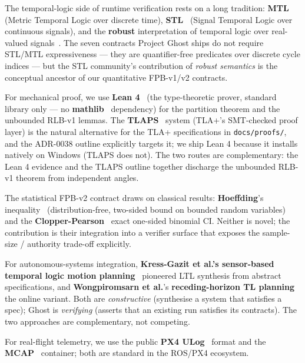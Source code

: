 \documentclass[11pt,a4paper]{article}
\begin{document}
The temporal-logic side of runtime verification rests on a long
tradition: \textbf{MTL}~\cite{koymans1990specifying} (Metric
Temporal Logic over discrete time), \textbf{STL}~\cite{maler2004monitoring}
(Signal Temporal Logic over continuous signals), and the
\textbf{robust} interpretation of temporal logic over real-valued
signals~\cite{donze2013breach}. The seven contracts Project Ghost
ships do not require STL/MTL expressiveness --- they are
quantifier-free predicates over discrete cycle indices --- but
the STL community's contribution of \emph{robust semantics} is
the conceptual ancestor of our quantitative FPB-v1/v2 contracts.

For mechanical proof, we use \textbf{Lean 4}~\cite{moura2021lean4}
(the type-theoretic prover, standard library only --- no
\textbf{mathlib}~\cite{mathlib2024lean} dependency) for the
partition theorem and the unbounded RLB-v1 lemmas. The
\textbf{TLAPS}~\cite{cousineau2012tlaps} system (TLA+'s SMT-checked
proof layer) is the natural alternative for the TLA+
specifications in \texttt{docs/proofs/}, and the ADR-0038 outline
explicitly targets it; we ship Lean 4 because it installs natively
on Windows (TLAPS does not). The two routes are complementary:
the Lean 4 evidence and the TLAPS outline together discharge the
unbounded RLB-v1 theorem from independent angles.

The statistical FPB-v2 contract draws on classical results:
\textbf{Hoeffding}'s
inequality~\cite{hoeffding1963inequalities} (distribution-free,
two-sided bound on bounded random variables) and the
\textbf{Clopper-Pearson}~\cite{clopper1934binomial} exact
one-sided binomial CI. Neither is novel; the contribution is
their integration into a verifier surface that exposes the
sample-size / authority trade-off explicitly.

For autonomous-systems integration, \textbf{Kress-Gazit et al.'s
sensor-based temporal logic motion
planning}~\cite{kress2007shielding} pioneered LTL synthesis from
abstract specifications, and \textbf{Wongpiromsarn et al.}'s
\textbf{receding-horizon TL
planning}~\cite{wongpiromsarn2012receding} the online variant.
Both are \emph{constructive} (synthesise a system that satisfies
a spec); Ghost is \emph{verifying} (asserts that an existing run
satisfies its contracts). The two approaches are complementary,
not competing.

For real-flight telemetry, we use the public
\textbf{PX4 ULog}~\cite{px42024ulog} format and the
\textbf{MCAP}~\cite{foxglove2022mcap} container; both are
standard in the ROS/PX4 ecosystem.
\end{document}
